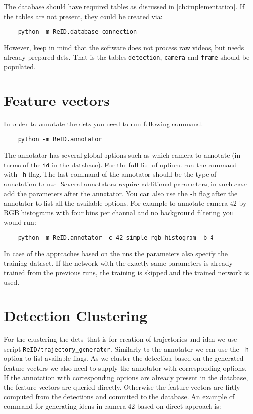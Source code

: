 The database should have required tables as discussed in \autoref{ch:implementation}. If the tables are not present, they could be created via:

\begin{verbatim}
    python -m ReID.database_connection
\end{verbatim}

However, keep in mind that the software does not process raw videos, but needs already prepared \glspl{det}. That is the tables \texttt{detection}, \texttt{camera} and \texttt{frame} should be populated.

\section{Feature vectors}

In order to annotate the \glspl{det} you need to run following command:

\begin{verbatim}
    python -m ReID.annotator
\end{verbatim}

The annotator has several global options such as which camera to annotate (in terms of the \verb+id+ in the database). For the full list of options run the command with \verb+-h+ flag. The last command of the annotator should be the type of annotation to use. Several annotators require additional parameters, in such case add the parameters after the annotator. You can also use the \verb+-h+ flag after the annotator to list all the available options. For example to annotate camera 42 by RGB histograms with four bins per channal and no background filtering you would run:

\begin{verbatim}
    python -m ReID.annotator -c 42 simple-rgb-histogram -b 4
\end{verbatim}

In case of the approaches based on the \glspl{nn} the parameters also specify the training dataset. If the network with the exactly same parameters is already trained from the previous runs, the training is skipped and the trained network is used.

\section{Detection Clustering}

For the clustering the \glspl{det}, that is for creation of trajectories and \gls{iden} we use script \texttt{ReID/trajectory\_generator}. Similarly to the annotator we can use the \verb+-h+ option to list available flags. As we cluster the detection based on the generated feature vectors we also need to supply the annotator with corresponding options. If the annotation with corresponding options are already present in the database, the feature vectors are queried directly. Otherwise the feature vectors are firtly computed from the detections and commited to the database. An example of command for generating \glspl{iden} in camera 42 based on direct approach is:

